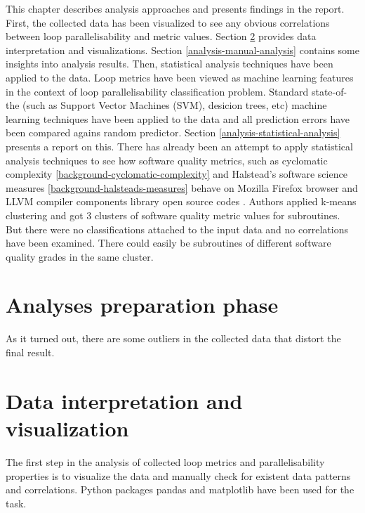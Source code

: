 \qquad This chapter describes analysis approaches and presents findings in the report. First, the collected data has been visualized to see any obvious correlations between loop parallelisability and metric values. Section \ref{analysis-data-interpretation-and-visualization} provides data interpretation and visualizations. Section \ref{analysis-manual-analysis} contains some insights into analysis results. Then, statistical analysis techniques have been applied to the data. Loop metrics have been viewed as machine learning features in the context of loop parallelisability classification problem. Standard state-of-the (such as Support Vector Machines (SVM), desicion trees, etc) machine learning techniques have been applied to the data and all prediction errors have been compared agains random predictor. Section \ref{analysis-statistical-analysis} presents a report on this. \newline
\null\qquad There has already been an attempt to apply statistical analysis techniques to see how software quality metrics, such as cyclomatic complexity \ref{background-cyclomatic-complexity} and Halstead's software science measures \ref{background-halsteads-measures} behave on Mozilla Firefox browser and LLVM compiler components library open source codes \cite{source-code-quality-classification-paper}. Authors applied k-means clustering and got 3 clusters of software quality metric values for subroutines. But there were no classifications attached to the input data and no correlations have been examined. There could easily be subroutines of different software quality grades in the same cluster. \newline

\section{Analyses preparation phase}
\label{analysis-preparation-phase}
\qquad As it turned out, there are some outliers in the collected data that distort the final result. 

\section{Data interpretation and visualization}
\label{analysis-data-interpretation-and-visualization}
\qquad The first step in the analysis of collected loop metrics and parallelisability properties is to visualize the data and manually check for existent data patterns and correlations. Python packages pandas \cite{python-lib-pandas} and matplotlib \cite{python-matplotlib} have been used for the task. 

